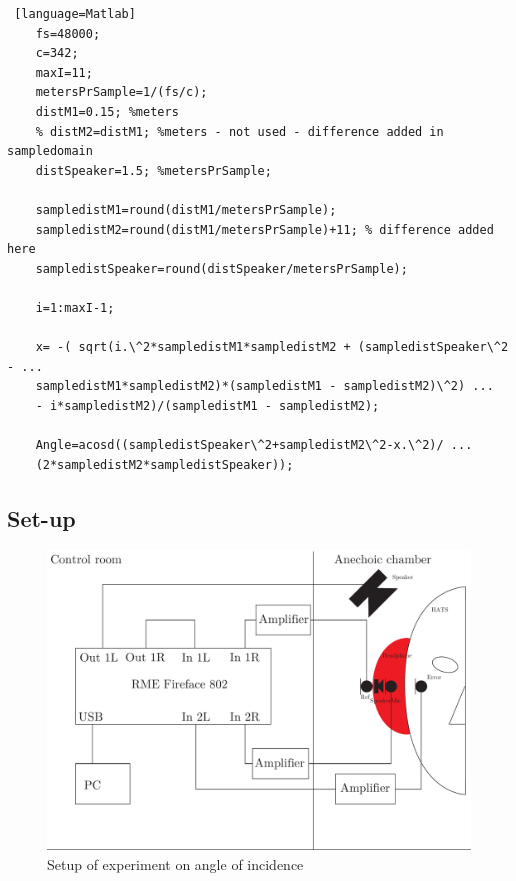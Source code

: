 \begin{lstlisting} [language=Matlab]
	fs=48000;
	c=342;
	maxI=11;
	metersPrSample=1/(fs/c);
	distM1=0.15; %meters
	% distM2=distM1; %meters - not used - difference added in sampledomain
	distSpeaker=1.5; %metersPrSample;
	
	sampledistM1=round(distM1/metersPrSample);
	sampledistM2=round(distM1/metersPrSample)+11; % difference added here
	sampledistSpeaker=round(distSpeaker/metersPrSample);
	
	i=1:maxI-1;
	
	x= -( sqrt(i.\^2*sampledistM1*sampledistM2 + (sampledistSpeaker\^2 - ...
	sampledistM1*sampledistM2)*(sampledistM1 - sampledistM2)\^2) ...
	- i*sampledistM2)/(sampledistM1 - sampledistM2);
	
	Angle=acosd((sampledistSpeaker\^2+sampledistM2\^2-x.\^2)/ ...
	(2*sampledistM2*sampledistSpeaker));
\end{lstlisting}

\subsection{Set-up}
\begin{figure}[H]
	\includegraphics[width=\textwidth]{../Journal/Experiments/AngleOfIncidence/AngleOfIncidenceSetup.pdf}
	\caption{Setup of experiment on angle of incidence}
	\label{Fig:AngleOfIncidenceSetup}
\end{figure}

